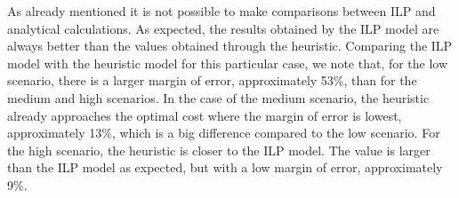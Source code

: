 \vspace{13pt}
As already mentioned it is not possible to make comparisons between ILP and analytical calculations. As expected, the results obtained by the ILP model are always better than the values obtained through the heuristic. Comparing the ILP model with the heuristic model for this particular case, we note that, for the low scenario, there is a larger margin of error, approximately 53\%, than for the medium and high scenarios.
In the case of the medium scenario, the heuristic already approaches the optimal cost where the margin of error is lowest, approximately 13\%, which is a big difference compared to the low scenario.
For the high scenario, the heuristic is closer to the ILP model. The value is larger than the ILP model as expected, but with a low margin of error, approximately 9\%.

